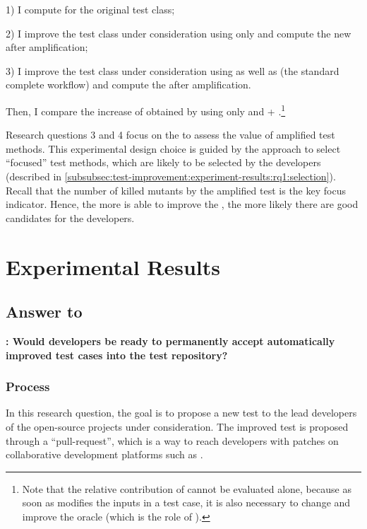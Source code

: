 \begin{itemize}
	1) I compute \ams for the original test class;
	
	2) I improve the test class under consideration using only \Aampl{} and compute the new \ams after amplification; 
	
	3) I improve the test class under consideration using \Iampl{} as well as \Aampl{} (the standard complete \dspot workflow) and compute the \ams after amplification. 
	
	Then, I compare the increase of \ms obtained by using \Aampl{} only and \Aampl{} + \Iampl{}.\footnote{Note that the relative contribution of \Iampl{} cannot be evaluated alone, because as soon as \dspot modifies the inputs in a test case, it is also necessary to change and improve the oracle (which is the role of \Aampl{}).}
\end{itemize}

Research questions 3 and 4 focus on the \ms to assess the value of amplified test methods.
This experimental design choice is guided by the approach to select ``focused'' test methods, which are likely to be selected by the developers (described in \autoref{subsubsec:test-improvement:experiment-results:rq1:selection}). 
Recall that the number of killed mutants by the amplified test is the key focus indicator. 
Hence, the more \dspot is able to improve the \ms, the more likely there are good candidates for the developers.

\section{Experimental Results}
\label{sec:test-improvement:experiment-results}

\subsection{Answer to \rqpullrequest}
\label{subsec:test-improvement:experiment-results:rq1}

\textbf{\rqpullrequest: Would developers be ready to permanently accept automatically improved test cases into the test repository?}

\subsubsection{Process}
\label{subsubsec:test-improvement:experiment-results:rq1:process}

In this research question, the goal is to propose a new test to the lead developers of the open-source projects under consideration. 
The improved test is proposed through a ``pull-request'', which is a way to reach developers with patches on collaborative development platforms such as \gh.

